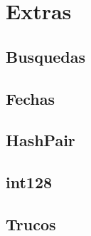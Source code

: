 \section{Extras}
\subsection{Busquedas}
\raggedbottom
\hrulefill
\subsection{Fechas}
\raggedbottom
\hrulefill
\subsection{HashPair}
\raggedbottom
\hrulefill
\subsection{int128}
\raggedbottom
\hrulefill
\subsection{Trucos}
\raggedbottom
\hrulefill
\newpage


